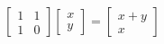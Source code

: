 \documentclass[preview]{standalone}
\begin{document}
\begin{align*}
\begin{bmatrix} 1 & 1 \\ 1 & 0 \end{bmatrix}  \begin{bmatrix} x \\ y \end{bmatrix}  =  \begin{bmatrix} x+y \\ x \end{bmatrix}
\end{align*}
\end{document}
